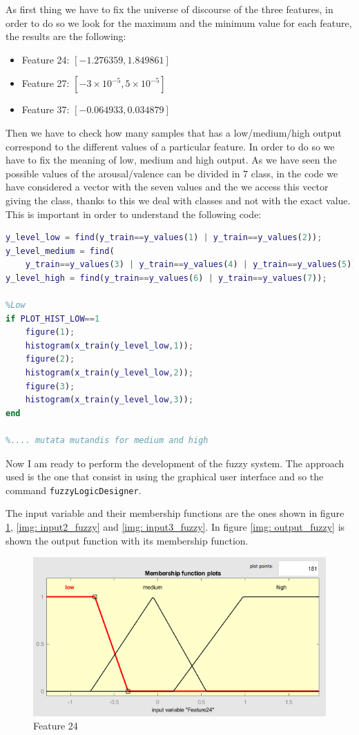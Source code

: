 \documentclass[a4paper]{report}
\begin{document}
	\noindent As first thing we have to fix the universe of discourse of the three features, in order to do so we look for the maximum and the minimum value for each feature, the results are the following:
	\begin{itemize}
		\item Feature 24: $[-1.276359,1.849861]$
 		\item Feature 27: $[-3 \times 10^{-5}, 5 \times 10^{-5}]$
		\item Feature 37: $[-0.064933, 0.034879]$
	\end{itemize}
	
	\noindent Then we have to check how many samples that has a low/medium/high output correspond to the different values of a particular feature. In order to do so we have to fix the meaning of low, medium and high output. As we have seen the possible values of the arousal/valence can be divided in 7 class, in the code we have considered a vector with the seven values and the we access this vector giving the class, thanks to this we deal with classes and not with the exact value. This is important in order to understand the following code:
	\begin{lstlisting}[language=Matlab]
y_level_low = find(y_train==y_values(1) | y_train==y_values(2));
y_level_medium = find(
	y_train==y_values(3) | y_train==y_values(4) | y_train==y_values(5));
y_level_high = find(y_train==y_values(6) | y_train==y_values(7));
		
%Low
if PLOT_HIST_LOW==1
	figure(1);
	histogram(x_train(y_level_low,1));
	figure(2);
	histogram(x_train(y_level_low,2));
	figure(3);
	histogram(x_train(y_level_low,3));
end
		
%.... mutata mutandis for medium and high
	\end{lstlisting}
	
	\noindent Now I am ready to perform the development of the fuzzy system. The approach used is the one that consist in using the graphical user interface and so the command \texttt{fuzzyLogicDesigner}.
	
	\noindent The input variable and their membership functions are the ones shown in figure \ref{img: input1_fuzzy}, \ref{img: input2_fuzzy} and \ref{img: input3_fuzzy}. In figure \ref{img: output_fuzzy} is shown the output function with its membership function.
	
	\begin{figure}[htbp]
		\centering
		\includegraphics[scale=1]{img/input1_fuzzy.png}
		\caption{Feature 24}
		\label{img: input1_fuzzy}
	\end{figure}
\end{document}
